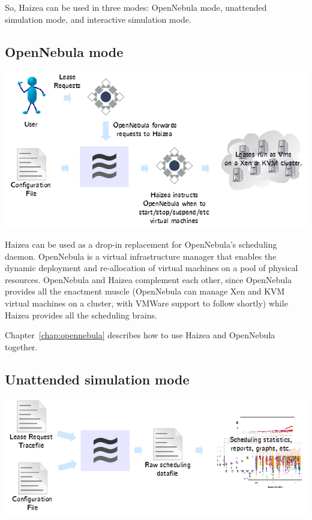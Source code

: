 So, Haizea can be used in three modes: OpenNebula mode, unattended simulation mode, and interactive simulation mode.

\subsection{OpenNebula mode}

\begin{center}
\includegraphics{images/mode_opennebula.png}
\end{center}

Haizea can be used as a drop-in replacement for OpenNebula's scheduling daemon. OpenNebula is a virtual infrastructure manager that enables the dynamic deployment and re-allocation of virtual machines on a pool of physical resources. OpenNebula and Haizea complement each other, since OpenNebula provides all the enactment muscle (OpenNebula can manage Xen and KVM virtual machines on a cluster, with VMWare support to follow shortly) while Haizea provides all the scheduling brains. 

Chapter~\ref{chap:opennebula} describes how to use Haizea and OpenNebula together.

\subsection{Unattended simulation mode}

\begin{center}
\includegraphics{images/mode_unattended_simulation.png}
\end{center}

